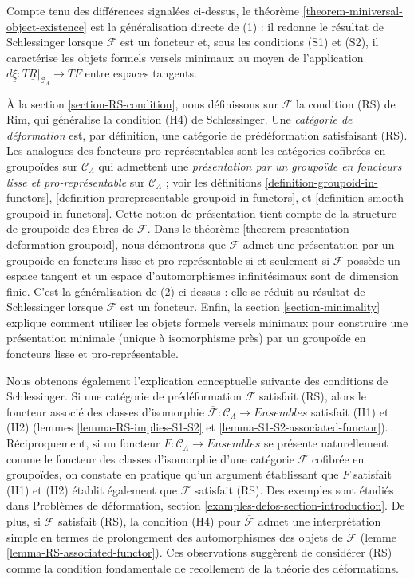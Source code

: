 \medskip\noindent
Compte tenu des différences signalées ci-dessus, le théorème
\ref{theorem-miniversal-object-existence} est la généralisation directe de
(1) : il redonne le résultat de Schlessinger lorsque $\mathcal{F}$ est un
foncteur et, sous les conditions (S1) et (S2), il caractérise les objets
formels versels minimaux au moyen de l'application
$d\underline{\xi} : T\underline{R}|_{\mathcal{C}_\Lambda} \to TF$
entre espaces tangents.

\medskip\noindent
À la section \ref{section-RS-condition}, nous définissons sur $\mathcal{F}$
la condition (RS) de Rim, qui généralise la condition (H4) de Schlessinger.
Une {\it catégorie de déformation} est, par définition, une catégorie de
prédéformation satisfaisant (RS). Les analogues des foncteurs
pro-représentables sont les catégories cofibrées en groupoïdes sur
$\mathcal{C}_\Lambda$ qui admettent une {\it présentation par un groupoïde
en foncteurs lisse et pro-représentable} sur $\mathcal{C}_\Lambda$ ; voir les
définitions \ref{definition-groupoid-in-functors},
\ref{definition-prorepresentable-groupoid-in-functors}, et
\ref{definition-smooth-groupoid-in-functors}.
Cette notion de présentation tient compte de la structure de groupoïde des
fibres de $\mathcal{F}$. Dans le théorème
\ref{theorem-presentation-deformation-groupoid}, nous démontrons que
$\mathcal{F}$ admet une présentation par un groupoïde en foncteurs lisse et
pro-représentable si et seulement si $\mathcal{F}$ possède un espace tangent et un espace
d'automorphismes infinitésimaux sont de dimension finie. C'est la
généralisation de (2) ci-dessus : elle se réduit au résultat de Schlessinger
lorsque $\mathcal{F}$ est un foncteur. Enfin, la section
\ref{section-minimality} explique comment utiliser les objets formels versels
minimaux pour construire une présentation minimale (unique à isomorphisme
près) par un groupoïde en foncteurs lisse et pro-représentable.

\medskip\noindent
Nous obtenons également l'explication conceptuelle suivante des conditions
de Schlessinger. Si une catégorie de prédéformation $\mathcal{F}$ satisfait
(RS), alors le foncteur associé des classes d'isomorphie
$\overline{\mathcal{F}}: \mathcal{C}_\Lambda \to \textit{Ensembles}$
satisfait (H1) et (H2) (lemmes \ref{lemma-RS-implies-S1-S2} et
\ref{lemma-S1-S2-associated-functor}).
Réciproquement, si un foncteur $F : \mathcal{C}_\Lambda \to \textit{Ensembles}$
se présente naturellement comme le foncteur des classes d'isomorphie d'une
catégorie $\mathcal{F}$ cofibrée en groupoïdes, on constate en pratique qu'un
argument établissant que $F$ satisfait (H1) et (H2) établit également que
$\mathcal{F}$ satisfait (RS). Des exemples sont étudiés dans Problèmes de
déformation, section
\ref{examples-defos-section-introduction}.
De plus, si $\mathcal{F}$ satisfait (RS), la condition (H4) pour
$\overline{\mathcal{F}}$ admet une interprétation simple en termes de
prolongement des automorphismes des objets de $\mathcal{F}$
(lemme \ref{lemma-RS-associated-functor}). Ces observations suggèrent de
considérer (RS) comme la condition fondamentale de recollement de la théorie
des déformations.




